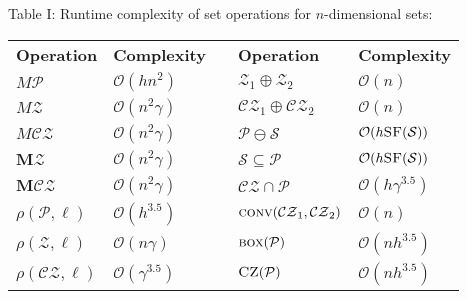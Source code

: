 \begin{small}
Table I: Runtime complexity of set operations for $n$-dimensional sets: 
\end{small}

\begin{center}
\begin{footnotesize}
\begin{tabular}{l l c l l}
	\toprule
	\textbf{Operation} & \textbf{Complexity} & & \textbf{Operation} & \textbf{Complexity} \\ \cmidrule{1-2} \cmidrule{4-5}
	$M \mathcal{P}$ & $\mathcal{O}(hn^2)$
		& & $\mathcal{Z}_1 \oplus \mathcal{Z}_2$ & $\mathcal{O}(n)$ \\
	$M\mathcal{Z}$ & $\mathcal{O}(n^2\gamma)$
	    & & $\mathcal{CZ}_1 \! \oplus \mathcal{CZ}_2$ & $\mathcal{O}(n)$ \\
	$M \mathcal{CZ}$ & $\mathcal{O}(n^2\gamma)$
		& & $\mathcal{P} \ominus \mathcal{S}$ & $\mathcal{O}(h \textsc{SF}(\mathcal{S}))$ \\
	$\mathbf{M} \mathcal{Z}$ & $\mathcal{O}(n^2\gamma)$
	    & & $\mathcal{S} \subseteq \mathcal{P}$ & $\mathcal{O}(h \textsc{SF}(\mathcal{S}))$ \\
	$\mathbf{M}\mathcal{CZ}$ & $\mathcal{O}(n^2\gamma)$
	    & & $\mathcal{CZ} \cap \mathcal{P}$ & $\mathcal{O}(h\gamma^{3.5})$ \\
	$\rho(\mathcal{P},\ell)$ & $\mathcal{O}(h^{3.5})$
	    & & $\textsc{conv}(\mathcal{CZ}_1,\mathcal{CZ}_2)$ & $\mathcal{O}(n)$ \\
	$\rho(\mathcal{Z},\ell)$ & $\mathcal{O}(n\gamma)$
		& & $\textsc{box}(\mathcal{P})$ & $\mathcal{O}(nh^{3.5})$ \\
	$\rho(\mathcal{CZ},\ell)$ & $\mathcal{O}(\gamma^{3.5})$
		& & $\textsc{CZ}(\mathcal{P})$ & $\mathcal{O}(nh^{3.5})$ \\
	\bottomrule
\end{tabular}
\end{footnotesize}
\end{center}
